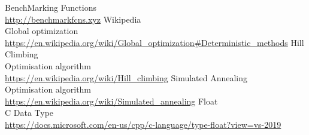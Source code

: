\documentclass{article}
\begin{document}
\begin{thebibliography}

BenchMarking Functions\\
\url{http://benchmarkfcns.xyz}
Wikipedia\\Global optimization\\
\url{https://en.wikipedia.org/wiki/Global_optimization#Deterministic_methods}
Hill Climbing\\Optimisation algorithm\\
\url{https://en.wikipedia.org/wiki/Hill_climbing}
Simulated Annealing\\Optimisation algorithm\\
\url{https://en.wikipedia.org/wiki/Simulated_annealing}
Float\\C Data Type\\
\url{https://docs.microsoft.com/en-us/cpp/c-language/type-float?view=vs-2019}
\end{thebibliography}  
\end{document}
